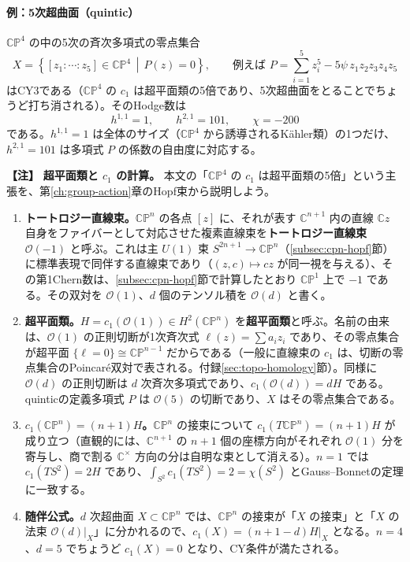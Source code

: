 \documentclass[uplatex, dvipdfmx, book]{jsbook}
\newenvironment{note}{\vspace{1ex}\par\footnotesize\noindent\textbf{【注】}}{\par\vspace{1ex}}
\begin{document}
\paragraph{例：5次超曲面（quintic）}
$\mathbb{CP}^4$ の中の5次の斉次多項式の零点集合
\begin{equation}
    X = \left\{ [z_1 : \cdots : z_5] \in \mathbb{CP}^4 \,\middle|\, P(z) = 0 \right\}, \qquad \text{例えば } P = \sum_{i=1}^5 z_i^5 - 5\psi\, z_1z_2z_3z_4z_5
\end{equation}
はCY3である（$\mathbb{CP}^4$ の $c_1$ は超平面類の5倍であり、5次超曲面をとることでちょうど打ち消される）。そのHodge数は
\begin{equation}
    h^{1,1} = 1, \qquad h^{2,1} = 101, \qquad \chi = -200
\end{equation}
である。$h^{1,1} = 1$ は全体のサイズ（$\mathbb{CP}^4$ から誘導されるK\"ahler類）の1つだけ、$h^{2,1} = 101$ は多項式 $P$ の係数の自由度に対応する。

\begin{note}
\textbf{超平面類と $c_1$ の計算。}
本文の「$\mathbb{CP}^4$ の $c_1$ は超平面類の5倍」という主張を、第\ref{ch:group-action}章のHopf束から説明しよう。
\begin{enumerate}
    \item \textbf{トートロジー直線束。}$\mathbb{CP}^n$ の各点 $[z]$ に、それが表す $\mathbb{C}^{n+1}$ 内の直線 $\mathbb{C}z$ 自身をファイバーとして対応させた複素直線束を\textbf{トートロジー直線束} $\mathcal{O}(-1)$ と呼ぶ。これは主 $U(1)$ 束 $S^{2n+1} \to \mathbb{CP}^n$（\ref{subsec:cpn-hopf}節）に標準表現で同伴する直線束であり（$(z, c) \mapsto cz$ が同一視を与える）、その第1Chern数は、\ref{subsec:cpn-hopf}節で計算したとおり $\mathbb{CP}^1$ 上で $-1$ である。その双対を $\mathcal{O}(1)$、$d$ 個のテンソル積を $\mathcal{O}(d)$ と書く。
    \item \textbf{超平面類。}$H = c_1(\mathcal{O}(1)) \in H^2(\mathbb{CP}^n)$ を\textbf{超平面類}と呼ぶ。名前の由来は、$\mathcal{O}(1)$ の正則切断が1次斉次式 $\ell(z) = \sum a_i z_i$ であり、その零点集合が超平面 $\{\ell = 0\} \cong \mathbb{CP}^{n-1}$ だからである（一般に直線束の $c_1$ は、切断の零点集合のPoincar\'e双対で表される。付録\ref{sec:topo-homology}節）。同様に $\mathcal{O}(d)$ の正則切断は $d$ 次斉次多項式であり、$c_1(\mathcal{O}(d)) = dH$ である。quinticの定義多項式 $P$ は $\mathcal{O}(5)$ の切断であり、$X$ はその零点集合である。
    \item \textbf{$c_1(\mathbb{CP}^n) = (n+1)H$。}$\mathbb{CP}^n$ の接束について $c_1(T\mathbb{CP}^n) = (n+1)H$ が成り立つ（直観的には、$\mathbb{C}^{n+1}$ の $n+1$ 個の座標方向がそれぞれ $\mathcal{O}(1)$ 分を寄与し、商で割る $\mathbb{C}^\times$ 方向の分は自明な束として消える）。$n = 1$ では $c_1(TS^2) = 2H$ であり、$\int_{S^2} c_1(TS^2) = 2 = \chi(S^2)$ とGauss--Bonnetの定理に一致する。
    \item \textbf{随伴公式。}$d$ 次超曲面 $X \subset \mathbb{CP}^n$ では、$\mathbb{CP}^n$ の接束が「$X$ の接束」と「$X$ の法束 $\mathcal{O}(d)|_X$」に分かれるので、$c_1(X) = (n + 1 - d)H|_X$ となる。$n = 4$、$d = 5$ でちょうど $c_1(X) = 0$ となり、CY条件が満たされる。
\end{enumerate}
\end{note}
\end{document}
